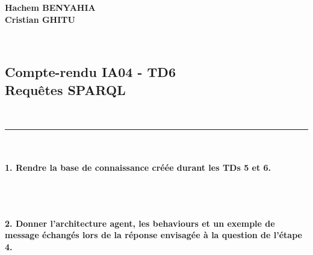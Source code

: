 \documentclass[11pt]{report}
\begin{document}
\noindent
\textbf{Hachem BENYAHIA}
~\\
\textbf{Cristian GHITU}

~\\
\begin{center}
\section*{Compte-rendu IA04 - TD6 ~\\ Requêtes SPARQL}

~\\
\rule{\textwidth}{1pt}
\end{center}

~\\\\
\textbf{1. Rendre la base de connaissance créée durant les TDs 5 et 6.}

~\\


~\\\\
\textbf{2. Donner l'architecture agent, les behaviours et un exemple de message échangés lors de la réponse envisagée à la question de l'étape 4.}
\end{document}
